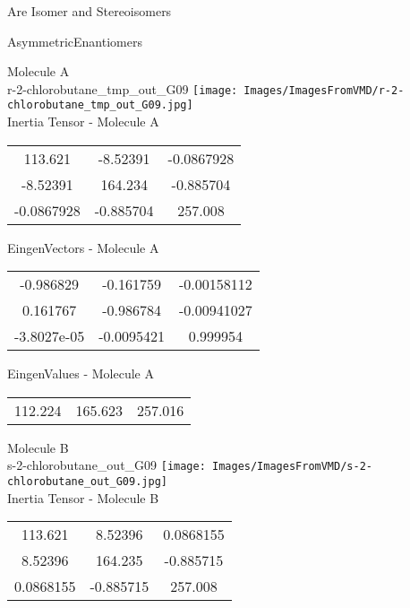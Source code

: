 \begin{center}
\vtab
\vtab
\textcolor{NavyBlue}{\Large Are Isomer and Stereoisomers}
\end{center}
\newpage

\vtab[-2cm]
\begin{center}
{\large AsymmetricEnantiomers}
\end{center}
\begin{multicols}{2}
\begin{center}
Molecule A \\ 
r-2-chlorobutane\_tmp\_out\_G09
\texttt{[image: Images/ImagesFromVMD/r-2-chlorobutane\_tmp\_out\_G09.jpg]}
\\
Inertia Tensor - Molecule A \\
\vtab
\begin{tabular}{|c c c|}
113.621	 & 	-8.52391	 & 	-0.0867928	 \\
-8.52391	 & 	164.234	 & 	-0.885704	 \\
-0.0867928	 & 	-0.885704	 & 	257.008
\end{tabular}

\vtab
 EingenVectors - Molecule A     \\
\vtab
\begin{tabular}{|c c c|}
-0.986829	 & 	-0.161759	 & 	-0.00158112	 \\
0.161767	 & 	-0.986784	 & 	-0.00941027	 \\
-3.8027e-05	 & 	-0.0095421	 & 	0.999954
\end{tabular}

\vtab
 EingenValues - Molecule A     \\
\vtab
\begin{tabular}{|c c c|}
112.224	 & 	165.623	 & 	257.016
\end{tabular}
\columnbreak

Molecule B \\ 
s-2-chlorobutane\_out\_G09
\texttt{[image: Images/ImagesFromVMD/s-2-chlorobutane\_out\_G09.jpg]}
\\
Inertia Tensor - Molecule B \\
\vtab
\begin{tabular}{|c c c|}
113.621	 & 	8.52396	 & 	0.0868155	 \\
8.52396	 & 	164.235	 & 	-0.885715	 \\
0.0868155	 & 	-0.885715	 & 	257.008
\end{tabular}


\end{center}
\end{multicols}

